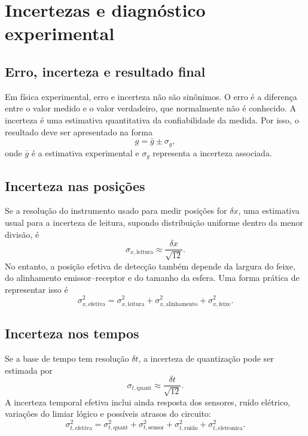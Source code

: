 \documentclass[11pt,a4paper]{article}
\begin{document}
\section{Incertezas e diagnóstico experimental}

\subsection{Erro, incerteza e resultado final}

Em física experimental, erro e incerteza não são sinônimos. O erro é a diferença entre o valor medido e o valor verdadeiro, que normalmente não é conhecido. A incerteza é uma estimativa quantitativa da confiabilidade da medida. Por isso, o resultado deve ser apresentado na forma
\begin{equation}
  g=\bar g\pm \sigma_g,
\end{equation}
onde $\bar g$ é a estimativa experimental e $\sigma_g$ representa a incerteza associada.

\subsection{Incerteza nas posições}

Se a resolução do instrumento usado para medir posições for $\delta x$, uma estimativa usual para a incerteza de leitura, supondo distribuição uniforme dentro da menor divisão, é
\begin{equation}
  \sigma_{x,\mathrm{leitura}}\approx\frac{\delta x}{\sqrt{12}}.
\end{equation}
No entanto, a posição efetiva de detecção também depende da largura do feixe, do alinhamento emissor--receptor e do tamanho da esfera. Uma forma prática de representar isso é
\begin{equation}
  \sigma_{x,\mathrm{efetiva}}^2
  =\sigma_{x,\mathrm{leitura}}^2
  +\sigma_{x,\mathrm{alinhamento}}^2
  +\sigma_{x,\mathrm{feixe}}^2.
\end{equation}

\subsection{Incerteza nos tempos}

Se a base de tempo tem resolução $\delta t$, a incerteza de quantização pode ser estimada por
\begin{equation}
  \sigma_{t,\mathrm{quant}}\approx\frac{\delta t}{\sqrt{12}}.
\end{equation}
A incerteza temporal efetiva inclui ainda resposta dos sensores, ruído elétrico, variações do limiar lógico e possíveis atrasos do circuito:
\begin{equation}
  \sigma_{t,\mathrm{efetiva}}^2
  =\sigma_{t,\mathrm{quant}}^2
  +\sigma_{t,\mathrm{sensor}}^2
  +\sigma_{t,\mathrm{ruido}}^2
  +\sigma_{t,\mathrm{eletronica}}^2.
\end{equation}
\end{document}
